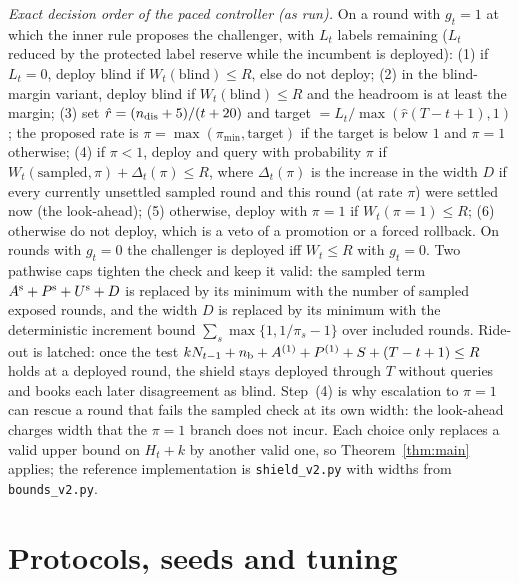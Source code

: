 \documentclass[10pt]{article}
\theoremstyle{plain}
\theoremstyle{definition}
\begin{document}
\emph{Exact decision order of the paced controller (as run).} On a round with $g_t=1$ at which the inner rule proposes the challenger, with $L_t$ labels remaining ($L_t$ reduced by the protected label reserve while the incumbent is deployed): (1) if $L_t=0$, deploy blind if $W_t(\text{blind})\le R$, else do not deploy; (2) in the blind-margin variant, deploy blind if $W_t(\text{blind})\le R$ and the headroom is at least the margin; (3) set $\hat r=(n_{\rm dis}+5)/(t+20)$ and target $=L_t/\max(\hat r(T-t+1),1)$; the proposed rate is $\pi=\max(\pi_{\min},\text{target})$ if the target is below $1$ and $\pi=1$ otherwise; (4) if $\pi<1$, deploy and query with probability $\pi$ if $W_t(\text{sampled},\pi)+\Delta_t(\pi)\le R$, where $\Delta_t(\pi)$ is the increase in the width $D$ if every currently unsettled sampled round and this round (at rate $\pi$) were settled now (the look-ahead); (5) otherwise, deploy with $\pi=1$ if $W_t(\pi{=}1)\le R$; (6) otherwise do not deploy, which is a veto of a promotion or a forced rollback. On rounds with $g_t=0$ the challenger is deployed iff $W_t\le R$ with $g_t=0$. Two pathwise caps tighten the check and keep it valid: the sampled term $A^{\rm s}+P^{\rm s}+U^{\rm s}+D$ is replaced by its minimum with the number of sampled exposed rounds, and the width $D$ is replaced by its minimum with the deterministic increment bound $\sum_s\max\{1,1/\pi_s-1\}$ over included rounds. Ride-out is latched: once the test $kN_{t-1}+n_{\rm b}+A^{(1)}+P^{(1)}+S+(T-t+1)\le R$ holds at a deployed round, the shield stays deployed through $T$ without queries and books each later disagreement as blind. Step~(4) is why escalation to $\pi=1$ can rescue a round that fails the sampled check at its own width: the look-ahead charges width that the $\pi=1$ branch does not incur. Each choice only replaces a valid upper bound on $H_t+k$ by another valid one, so Theorem~\ref{thm:main} applies; the reference implementation is \texttt{shield\_v2.py} with widths from \texttt{bounds\_v2.py}.

\section{Protocols, seeds and tuning}\label{app:protocols}
\end{document}
